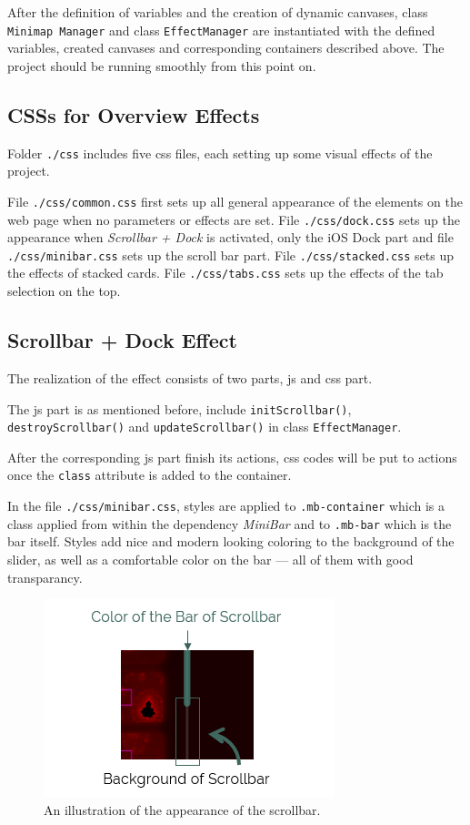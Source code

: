 After the definition of variables and the creation of dynamic canvases, class \texttt{Minimap Manager} and class \texttt{EffectManager} are instantiated with the defined variables, created canvases and corresponding containers described above. The project should be running smoothly from this point on.

\subsection{CSSs for Overview Effects}
\label{chap4:frontend-css}

Folder \texttt{./css} includes five \gls{css} files, each setting up some visual effects of the project.

File \texttt{./css/common.css} first sets up all general appearance of the elements on the web page when no parameters or effects are set. File \texttt{./css/dock.css} sets up the appearance when \emph{Scrollbar + Dock} is activated, only the iOS Dock part and file \\\texttt{./css/minibar.css} sets up the scroll bar part. File \texttt{./css/stacked.css} sets up the effects of stacked cards. File \texttt{./css/tabs.css} sets up the effects of the tab selection on the top.

\subsection{Scrollbar + Dock Effect}
\label{chap4:scrollbar}

The realization of the effect consists of two parts, \gls{js} and \gls{css} part.

The \gls{js} part is as mentioned before, include \texttt{initScrollbar()}, \texttt{destroyScrollbar()} and \texttt{updateScrollbar()} in class \texttt{EffectManager}.

After the corresponding \gls{js} part finish its actions, \gls{css} codes will be put to actions once the \texttt{class} attribute is added to the container.

In the file \texttt{./css/minibar.css}, styles are applied to \texttt{.mb-container} which is a class applied from within the dependency \emph{MiniBar} and to \texttt{.mb-bar} which is the bar itself. Styles add nice and modern looking coloring to the background of the slider, as well as a comfortable color on the bar --- all of them with good transparancy.

\begin{figure}[H]
\centering
\includegraphics[width=.45\textwidth,keepaspectratio]{Figures/Chapter4/minibar.png}
\decoRule
\caption[Styles of Scrollbar]{An illustration of the appearance of the scrollbar.}
\label{fig:minibar}
\end{figure}

